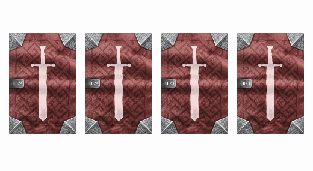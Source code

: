 \documentclass{minimal}
\begin{document}
{\begin{longtable}{llll}
\includegraphics[width=44mm,height=68mm]{./22-28/gh-024-amulet-of-life-back.png} &
\includegraphics[width=44mm,height=68mm]{./22-28/gh-024-amulet-of-life-back.png} &
\includegraphics[width=44mm,height=68mm]{./22-28/gh-023-chainmail-back.png} &
\includegraphics[width=44mm,height=68mm]{./22-28/gh-023-chainmail-back.png}\\ 

\end{longtable}}
\end{document}
